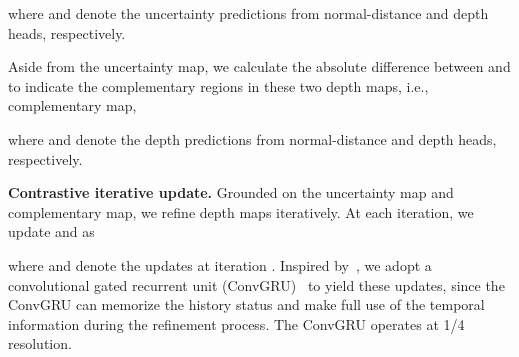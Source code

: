 \documentclass[10pt,twocolumn,letterpaper]{article}
\begin{document}
where  and  denote the uncertainty predictions from normal-distance and depth heads, respectively.

Aside from the uncertainty map, we calculate the absolute difference between  and  to indicate the complementary regions in these two depth maps, i.e., complementary map,

where  and  denote the depth predictions from normal-distance and depth heads, respectively. 

\textbf{Contrastive iterative update.}
Grounded on the uncertainty map and complementary map, we refine depth maps iteratively. At each iteration, we update  and  as

where  and  denote the updates at iteration . Inspired by~\cite{teed2020raft}, we adopt a convolutional gated recurrent unit (ConvGRU)~\cite{chung2014empirical} to yield these updates, since the ConvGRU can memorize the history status and make full use of the temporal information during the refinement process. The ConvGRU operates at 1/4 resolution.

\begin{table*}[htb!]
	\begin{center}
\renewcommand{\arraystretch}{1.3}
	\end{center}
	\caption{\textbf{Quantitative depth comparison on the NYU-Depth-v2 dataset}. } \label{table1}
\end{table*}
\end{document}
